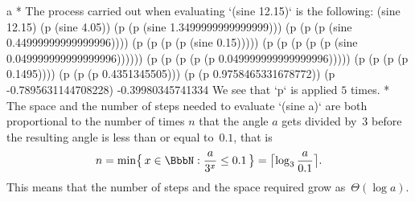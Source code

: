 \begitems\novspaces\style a
* The process carried out when evaluating `(sine 12.15)` is the following:
\begtt\scm
(sine 12.15)
(p (sine 4.05))
(p (p (sine 1.3499999999999999)))
(p (p (p (sine 0.44999999999999996))))
(p (p (p (p (sine 0.15)))))
(p (p (p (p (p (sine 0.049999999999999996))))))
(p (p (p (p (p 0.049999999999999996)))))
(p (p (p (p 0.1495))))
(p (p (p 0.4351345505)))
(p (p 0.9758465331678772))
(p -0.7895631144708228)
-0.39980345741334
\endtt
We see that `p` is applied $5$ times.
\smallskip
* The space and the number of steps needed to evaluate `(sine a)` are both proportional to the number of times $n$ that the angle $a$ gets divided by~$3$ before the resulting angle is less than or equal to~$0.1$, that is
$$
n = \min\bigl\{\,x\in \BbbN : {a\over 3^x} \leq 0.1\,\bigr\} = \bigl\lceil\log_3{a \over 0.1}\bigr\rceil \hbox{.}
$$ 
This means that the number of steps and the space required grow as~$\Theta(\log a)$.
\enditems
